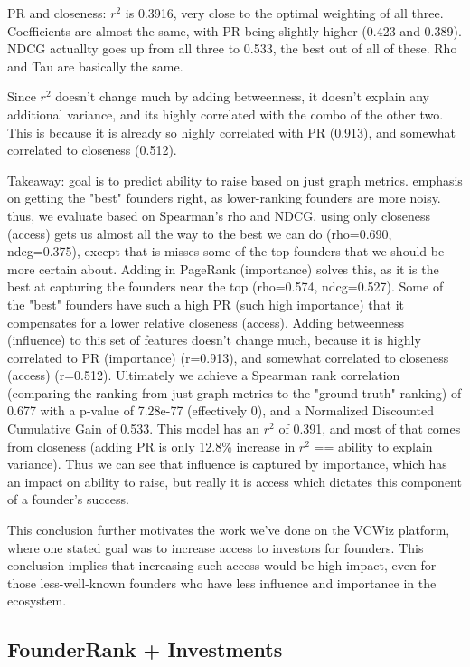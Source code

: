 PR and closeness: $r^2$ is 0.3916, very close to the optimal weighting of all three. Coefficients are almost the same, with PR being slightly higher (0.423 and 0.389). NDCG actuallty goes up from all three to 0.533, the best out of all of these. Rho and Tau are basically the same.

Since $r^2$ doesn't change much by adding betweenness, it doesn't explain any additional variance, and its highly correlated with the combo of the other two. This is because it is already so highly correlated with PR (0.913), and somewhat correlated to closeness (0.512).

Takeaway: goal is to predict ability to raise based on just graph metrics. emphasis on getting the "best" founders right, as lower-ranking founders are more noisy. thus, we evaluate based on Spearman's rho and NDCG. using only closeness (access) gets us almost all the way to the best we can do (rho=0.690, ndcg=0.375), except that is misses some of the top founders that we should be more certain about. Adding in PageRank (importance) solves this, as it is the best at capturing the founders near the top (rho=0.574, ndcg=0.527). Some of the "best" founders have such a high PR (such high importance) that it compensates for a lower relative closeness (access). Adding betweenness (influence) to this set of features doesn't change much, because it is highly correlated to PR (importance) (r=0.913), and somewhat correlated to closeness (access) (r=0.512). Ultimately we achieve a Spearman rank correlation (comparing the ranking from just graph metrics to the "ground-truth" ranking) of 0.677 with a p-value of 7.28e-77 (effectively 0), and a Normalized Discounted Cumulative Gain of 0.533. This model has an $r^2$ of 0.391, and most of that comes from closeness (adding PR is only 12.8\% increase in $r^2$ == ability to explain variance). Thus we can see that influence is captured by importance, which has an impact on ability to raise, but really it is access which dictates this component of a founder's success.

This conclusion further motivates the work we've done on the VCWiz platform, where one stated goal was to increase access to investors for founders. This conclusion implies that increasing such access would be high-impact, even for those less-well-known founders who have less influence and importance in the ecosystem.

\subsection{FounderRank + Investments}

